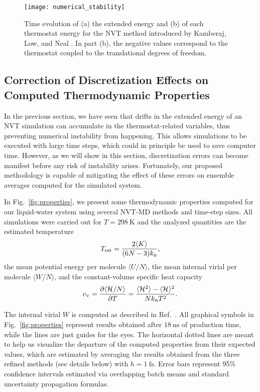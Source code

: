 \documentclass[
	aip,
	jcp,
	reprint,
]{revtex4-1}
\newcommand{\Ham}[1]{{\mathcal H}_\text{#1}}           %
\newcommand{\timestep}{h}
\newcommand{\mini}[1]{\text{\tiny{#1}}}
\begin{document}
\begin{figure}
	\texttt{[image: numerical\_stability]}
	\caption{Time evolution of (a) the extended energy and (b) of each thermostat energy for the NVT method introduced by Kamberaj, Low, and Neal \cite{Kamberaj_2005}. In part (b), the negative values correspond to the thermostat coupled to the translational degrees of freedom.}
	\label{fig:num_stab}
\end{figure}

\subsection{Correction of Discretization Effects on Computed Thermodynamic Properties}
\label{sec:discretization effects}

In the previous section, we have seen that drifts in the extended energy of an NVT simulation can accumulate in the thermostat-related variables, thus preventing numerical instability from happening.
This allows simulations to be executed with large time steps, which could in principle be used to save computer time.
However, as we will show in this section, discretization errors can become manifest before any risk of instability arises.
Fortunately, our proposed methodology is capable of mitigating the effect of these errors on ensemble averages computed for the simulated system.

In Fig.~\ref{fig:properties}, we present some thermodynamic properties computed for our liquid-water system using several NVT-MD methods and time-step sizes.
All simulations were carried out for $T = 298~\text{K}$ and the analyzed quantities are the estimated temperature
\begin{equation*}
T_\text{est} = \frac{2\langle K \rangle}{(6N-3)k_\mini{B}},
\end{equation*}
the mean potential energy per molecule $\langle U/N \rangle$,
the mean internal virial per molecule $\langle W/N \rangle$, and
the constant-volume specific heat capacity
\begin{equation*}
c_\mini{V} = \frac{\partial \langle \Ham{}/N \rangle}{\partial T} = \frac{\langle \Ham{}^2 \rangle - \langle \Ham{} \rangle^2}{N k_\mini{B} T^2}.
\end{equation*}

The internal virial $W$ is computed as described in Ref.~.
All graphical symbols in Fig.~\ref{fig:properties} represent results obtained after $18~\text{ns}$ of production time, while the lines are just guides for the eyes.
The horizontal dotted lines are meant to help us visualize the departure of the computed properties from their expected values, which are estimated by averaging the results obtained from the three refined methods (see details below) with $\timestep = 1~\text{fs}$.
Error bars represent 95\% confidence intervals estimated via overlapping batch means \cite{Meketon_1984, Flegal_2010} and standard uncertainty propagation formulas.
\end{document}
